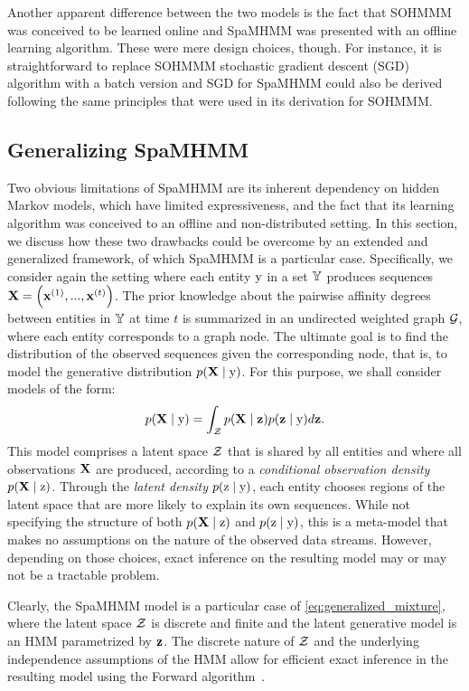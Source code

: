 Another apparent difference between the two models is the fact that SOHMMM was conceived to be learned online and SpaMHMM was presented with an offline learning algorithm. These were mere design choices, though. For instance, it is straightforward to replace SOHMMM stochastic gradient descent (SGD) algorithm with a batch version and SGD for SpaMHMM could also be derived following the same principles that were used in its derivation for SOHMMM.

\subsection{Generalizing SpaMHMM}

Two obvious limitations of SpaMHMM are its inherent dependency on hidden Markov models, which have limited expressiveness, and the fact that its learning algorithm was conceived to an offline and non-distributed setting. In this section, we discuss how these two drawbacks could be overcome by an extended and generalized framework, of which SpaMHMM is a particular case. Specifically, we consider again the setting where each entity ${\textnormal{y}}$ in a set ${\mathbb{Y}}$ produces sequences ${\mathbf{X}} = \left({\mathbf{x}}^{(1)}, ...,{\mathbf{x}}^{(t)} \right)$. The prior knowledge about the pairwise affinity degrees between entities in ${\mathbb{Y}}$ at time $t$ is summarized in an undirected weighted graph ${\mathcal{G}}$, where each entity corresponds to a graph node. The ultimate goal is to find the distribution of the observed sequences given the corresponding node, that is, to model the generative distribution $p({\mathbf{X}} \mid {\textnormal{y}})$. For this purpose, we shall consider models of the form:
\begin{equation}
\label{eq:generalized_mixture}
p({\mathbf{X}} \mid {\textnormal{y}}) = \int_{{\mathcal{Z}}} p({\mathbf{X}} \mid {\mathbf{z}}) p({\mathbf{z}} \mid {\textnormal{y}}) d{\mathbf{z}}.
\end{equation}
This model comprises a latent space ${\mathcal{Z}}$ that is shared by all entities and where all observations ${\mathbf{X}}$ are produced, according to a \textit{conditional observation density} $p({\mathbf{X}} \mid {\textnormal{z}})$. Through the \textit{latent density} $p({\textnormal{z}} \mid {\textnormal{y}})$, each entity chooses regions of the latent space that are more likely to explain its own sequences. While not specifying the structure of both $p({\mathbf{X}} \mid {\textnormal{z}})$ and $p({\textnormal{z}} \mid {\textnormal{y}})$, this is a meta-model that makes no assumptions on the nature of the observed data streams. However, depending on those choices, exact inference on the resulting model may or may not be a tractable problem.

Clearly, the SpaMHMM model is a particular case of \eqref{eq:generalized_mixture}, where the latent space ${\mathcal{Z}}$ is discrete and finite and the latent generative model is an HMM parametrized by ${\mathbf{z}}$. The discrete nature of ${\mathcal{Z}}$ and the underlying independence assumptions of the HMM allow for efficient exact inference in the resulting model using the Forward algorithm~\cite{Rabiner1986}.

